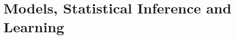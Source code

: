 \chapter{Models, Statistical Inference and Learning}

\begin{ex}
\end{ex}

\begin{ex}
\end{ex}

\begin{ex}
\end{ex}